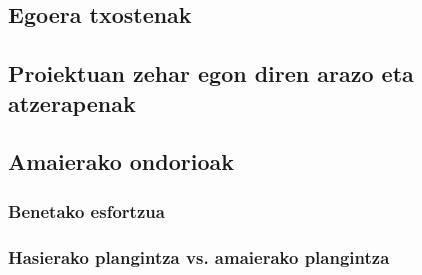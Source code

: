 \subsection{Egoera txostenak}

\subsection{Proiektuan zehar egon diren arazo eta atzerapenak}

\subsection{Amaierako ondorioak}

\subsubsection{Benetako esfortzua}

\subsubsection{Hasierako plangintza vs. amaierako plangintza}
